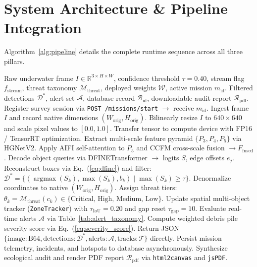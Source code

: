 \documentclass[conference]{IEEEtran}
\begin{document}
\section{System Architecture \& Pipeline Integration}

Algorithm~\ref{alg:pipeline} details the complete runtime sequence across all three pillars.

\begin{algorithm}[htbp]
\caption{Blue Sentinel Real-Time Inference, Alerting, and Audit Pipeline}
\label{alg:pipeline}
\begin{algorithmic}[1]
\REQUIRE Raw underwater frame $I \in \mathbb{R}^{3 \times H \times W}$, confidence threshold $\tau = 0.40$, stream flag $f_{\text{stream}}$, threat taxonomy $\mathcal{M}_{\text{threat}}$, deployed weights $\mathcal{W}$, active mission $m_{\text{id}}$.
\ENSURE Filtered detections $\mathcal{D}^*$, alert set $\mathcal{A}$, database record $\mathcal{B}_{\text{id}}$, downloadable audit report $\mathcal{R}_{\text{pdf}}$.
\STATE Register survey session via \texttt{POST /missions/start} $\to$ receive $m_{\text{id}}$.
\STATE Ingest frame $I$ and record native dimensions $(W_{\text{orig}}, H_{\text{orig}})$.
\STATE Bilinearly resize $I$ to $640 \times 640$ and scale pixel values to $[0.0, 1.0]$.
\STATE Transfer tensor to compute device with FP16 / TensorRT optimization.
\STATE Extract multi-scale feature pyramid $\{P_3, P_4, P_5\}$ via HGNetV2.
\STATE Apply AIFI self-attention to $P_5$ and CCFM cross-scale fusion $\to F_{\text{fused}}$.
\STATE Decode object queries via DFINETransformer $\to$ logits $S$, edge offsets $e_j$.
\STATE Reconstruct boxes via Eq.~(\ref{eq:dfine}) and filter: $\mathcal{D}^* = \{(\operatorname{argmax}(S_k), \max(S_k), b_k) \mid \max(S_k) \ge \tau\}$.
\STATE Denormalize coordinates to native $(W_{\text{orig}}, H_{\text{orig}})$.
\STATE Assign threat tiers: $\theta_k = \mathcal{M}_{\text{threat}}(c_k) \in \{\text{Critical, High, Medium, Low}\}$.
\STATE Update spatial multi-object tracker (\texttt{ZoneTracker}) with $\tau_{\text{IoU}} = 0.20$ and gap reset $\tau_{\text{gap}} = 10$.
\STATE Evaluate real-time alerts $\mathcal{A}$ via Table~\ref{tab:alert_taxonomy}.
\STATE Compute weighted debris pile severity score via Eq.~(\ref{eq:severity_score}).
    \STATE Return JSON $\{\text{image}: \text{B64}, \text{detections}: \mathcal{D}^*, \text{alerts}: \mathcal{A}, \text{tracks}: \mathcal{T}\}$ directly.
\ELSE
    \STATE Persist mission telemetry, incidents, and hotspots to database asynchronously.
    \STATE Synthesize ecological audit and render PDF report $\mathcal{R}_{\text{pdf}}$ via \texttt{html2canvas} and \texttt{jsPDF}.
\ENDIF
\end{algorithmic}
\end{algorithm}
\end{document}
